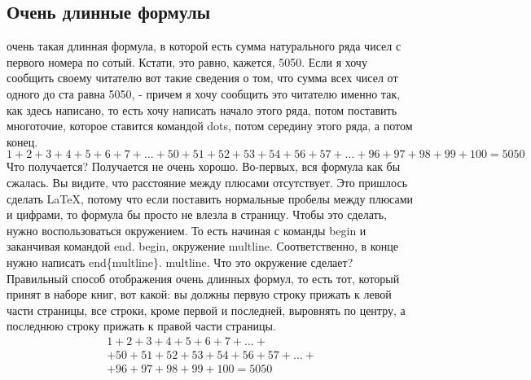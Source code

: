 \documentclass[a4paper,12pt]{article} %
\begin{document}
{\subsection{Очень длинные формулы}
очень такая длинная формула, в которой есть сумма натурального
ряда чисел с первого номера по сотый. Кстати, это равно, кажется, 5050. Если я хочу сообщить своему читателю вот
такие сведения о том, что сумма всех чисел от одного до ста
равна 5050, - причем я хочу сообщить это читателю
именно так, как здесь написано, то есть хочу написать начало этого ряда,
потом поставить многоточие, которое ставится командой dots, потом середину
этого ряда, а потом конец.
\[
1+2+3+4+5+6+7+\dots+50+51+52+53+54+56+57+\dots+96+97+98+99+100=5050
\]
 Что получается? Получается не очень хорошо. Во-первых, вся формула как бы сжалась. Вы видите, что расстояние между плюсами
 отсутствует. Это пришлось сделать LaTeX, потому что
 если поставить нормальные пробелы между плюсами и цифрами, то формула бы просто не
 влезла в страницу. 
 Чтобы это сделать, нужно воспользоваться
 окружением. То есть начиная с команды begin и
 заканчивая командой end. begin, окружение multline. Соответственно, в конце нужно написать
end\{multline\}. multline. Что это окружение сделает? Правильный способ отображения очень
длинных формул, то есть тот, который принят в наборе книг, вот какой: вы должны первую
строку прижать к левой части страницы, все строки, кроме первой и последней,
выровнять по центру, а последнюю строку прижать к
правой части страницы.
\begin{multline}
1+2+3+4+5+6+7+\dots+ \\ +50+51+52+53+54+56+57+\dots +\\ +96+97+98+99+100=5050
\end{multline}
}
\end{document}
